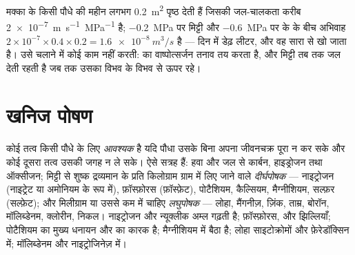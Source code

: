 \begin{example}[दिन में एक लीटर]\label{ex:b1:plant-water-minerals:litre}
मक्का के किसी पौधे की महीन  लगभग \qty{0.2}{m^2} पृष्ठ देती हैं
जिसकी जल-चालकता करीब \qty{2e-7}{m.s^{-1}.MPa^{-1}} है; \qty{-0.2}{MPa}
पर मिट्टी और \qty{-0.6}{MPa} पर  के  के बीच अभिवाह
$2\times 10^{-7}\times 0.4\times 0.2 = \qty{1.6e-8}{m^3/s}$ है --- दिन
में डेढ़ लीटर, और वह सारा  से खो जाता है।  उसे चलाने में कोई
काम नहीं करती:  का वाष्पोत्सर्जन तनाव तय करता है, और मिट्टी तब तक
जल देती रहती है जब तक उसका विभव  के विभव से ऊपर रहे।
\end{example}

\section{खनिज पोषण}

\begin{definition}[आवश्यक तत्व]\label{def:b1:plant-water-minerals:elements}
कोई तत्व किसी पौधे के लिए \emph{आवश्यक} है यदि पौधा उसके बिना अपना
जीवनचक्र पूरा न कर सके और कोई दूसरा तत्व उसकी जगह न ले सके। ऐसे सत्रह
हैं: हवा और जल से कार्बन, हाइड्रोजन तथा ऑक्सीजन; मिट्टी से शुष्क
द्रव्यमान के प्रति किलोग्राम ग्राम में लिए जाने वाले \emph{दीर्घपोषक} ---
नाइट्रोजन (नाइट्रेट या अमोनियम के रूप में), फ़ॉस्फ़ोरस (फ़ॉस्फ़ेट),
पोटैशियम, कैल्सियम, मैग्नीशियम, सल्फ़र (सल्फ़ेट); और मिलीग्राम या उससे
कम में चाहिए \emph{लघुपोषक} --- लोहा, मैंगनीज़, ज़िंक, ताम्र, बोरॉन,
मॉलिब्डेनम, क्लोरीन, निकल। नाइट्रोजन  और न्यूक्लीक अम्ल गढ़ती है;
फ़ॉस्फ़ोरस,  और झिल्लियाँ; पोटैशियम  का मुख्य धनायन
और  का  कारक है; मैग्नीशियम  में बैठा है; लोहा
साइटोक्रोमों और फ़ेरेडॉक्सिन में; मॉलिब्डेनम  और
नाइट्रोजिनेज़ में।
\end{definition}

